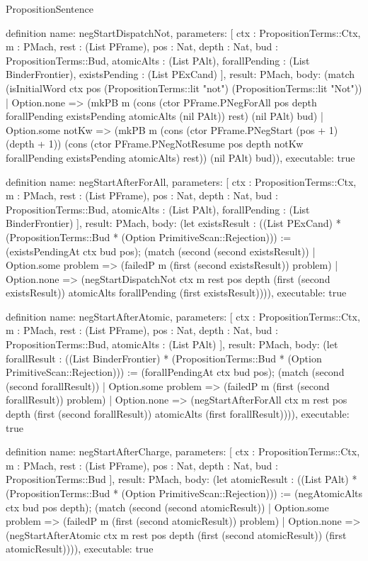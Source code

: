 \begin{lexlean}{PropositionSentence}
\begin{semanticmodule}
definition{
  name: negStartDispatchNot,
  parameters: [
    ctx : PropositionTerms::Ctx,
    m : PMach,
    rest : (List PFrame),
    pos : Nat,
    depth : Nat,
    bud : PropositionTerms::Bud,
    atomicAlts : (List PAlt),
    forallPending : (List BinderFrontier),
    existsPending : (List PExCand)
  ],
  result: PMach,
  body: (match (isInitialWord ctx pos (PropositionTerms::lit "not") (PropositionTerms::lit "Not"))
    | Option.none => (mkPB m (cons (ctor PFrame.PNegForAll pos depth forallPending existsPending atomicAlts (nil PAlt)) rest) (nil PAlt) bud)
    | Option.some notKw => (mkPB m (cons (ctor PFrame.PNegStart (pos + 1) (depth + 1)) (cons (ctor PFrame.PNegNotResume pos depth notKw forallPending existsPending atomicAlts) rest)) (nil PAlt) bud)),
  executable: true
}

definition{
  name: negStartAfterForAll,
  parameters: [
    ctx : PropositionTerms::Ctx,
    m : PMach,
    rest : (List PFrame),
    pos : Nat,
    depth : Nat,
    bud : PropositionTerms::Bud,
    atomicAlts : (List PAlt),
    forallPending : (List BinderFrontier)
  ],
  result: PMach,
  body: (let existsResult : ((List PExCand) * (PropositionTerms::Bud * (Option PrimitiveScan::Rejection))) := (existsPendingAt ctx bud pos); (match (second (second existsResult))
    | Option.some problem => (failedP m (first (second existsResult)) problem)
    | Option.none => (negStartDispatchNot ctx m rest pos depth (first (second existsResult)) atomicAlts forallPending (first existsResult)))),
  executable: true
}

definition{
  name: negStartAfterAtomic,
  parameters: [
    ctx : PropositionTerms::Ctx,
    m : PMach,
    rest : (List PFrame),
    pos : Nat,
    depth : Nat,
    bud : PropositionTerms::Bud,
    atomicAlts : (List PAlt)
  ],
  result: PMach,
  body: (let forallResult : ((List BinderFrontier) * (PropositionTerms::Bud * (Option PrimitiveScan::Rejection))) := (forallPendingAt ctx bud pos); (match (second (second forallResult))
    | Option.some problem => (failedP m (first (second forallResult)) problem)
    | Option.none => (negStartAfterForAll ctx m rest pos depth (first (second forallResult)) atomicAlts (first forallResult)))),
  executable: true
}

definition{
  name: negStartAfterCharge,
  parameters: [
    ctx : PropositionTerms::Ctx,
    m : PMach,
    rest : (List PFrame),
    pos : Nat,
    depth : Nat,
    bud : PropositionTerms::Bud
  ],
  result: PMach,
  body: (let atomicResult : ((List PAlt) * (PropositionTerms::Bud * (Option PrimitiveScan::Rejection))) := (negAtomicAlts ctx bud pos depth); (match (second (second atomicResult))
    | Option.some problem => (failedP m (first (second atomicResult)) problem)
    | Option.none => (negStartAfterAtomic ctx m rest pos depth (first (second atomicResult)) (first atomicResult)))),
  executable: true
}


\end{semanticmodule}
\end{lexlean}
